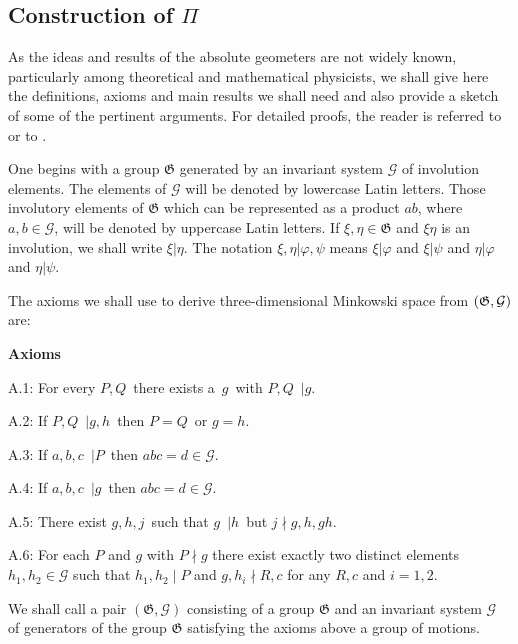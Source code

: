 \documentclass[a4paper,twoside,12pt]{article}
\def\nind{\noindent}
\def\Gs{{\cal G}}
\begin{document}
\subsection{Construction of $\Pi$}

     As the ideas and results of the absolute geometers are not widely
known, particularly among theoretical and mathematical physicists,
we shall give here the definitions, axioms and main results we shall
need and also provide a sketch of some of the pertinent arguments. 
For detailed proofs, the reader is referred to \cite{BBPW} or to \cite{Ba}.

     One begins with a group $\mathfrak{G}$ generated
by an invariant system $\mathcal{G}$ of involution elements. The elements 
of $\mathcal{G}$ will be denoted by lowercase Latin
letters. Those involutory elements of $\mathfrak{G}$ which can be
represented as a product $ab$, where $a,b\in \mathcal{G}$, will be denoted by
uppercase Latin letters. If $\xi ,\eta \in \mathfrak{G}$ and $\xi \eta $ is
an involution, we shall write $\xi |\eta$. The notation 
$\xi ,\eta |\varphi ,\psi $ means $\xi |\varphi $ and $\xi |\psi $ and 
$\eta |\varphi$ and $\eta |\psi$.

     The axioms we shall use to derive three-dimensional Minkowski space
from $(\mathfrak{G},\Gs)$ are:

\medskip

\noindent \textbf{Axioms}

A.1: For every $P,Q$\ there exists a\ $g$\ with $P,Q$\ $|g.$

A.2: If $P,Q$\ $|g,h$\ then $P=Q$\ or $g=h.$

A.3: If $a,b,c$\ $|P$\ then $abc=d\in \mathcal{G}.$

A.4: If $a,b,c$\ $|g$\ then $abc=d\in \mathcal{G}.$

A.5: There exist $g,h,j$\ such that $g$\ $|h$\ but $j\nmid g,h,gh.$

A.6: For each $P$ and $g$ with $P \nmid g$ there exist exactly two
distinct elements $h_1,h_2 \in \mathcal{G}$ such that 
$h_1,h_2 \mid P$ and $g,h_i \nmid R,c$ for any $R,c$ and $i=1,2$.   

\medskip

\nind We shall call a pair $(\mathfrak{G},\mathcal{G})$
consisting of a group $\mathfrak{G}$ and an invariant system
$\mathcal{G}$ of generators of the group $\mathfrak{G}$ satisfying the
axioms above a group of motions.
\end{document}
